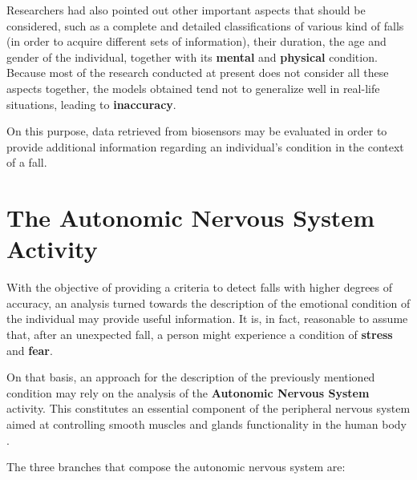 
Researchers had also pointed out other important aspects that should be considered, such as a complete and detailed classifications of various kind of falls (in order to acquire different sets of information), their duration, the age and gender of the individual, together with its \textbf{mental} and \textbf{physical} condition.
Because most of the research conducted at present does not consider all these aspects together, the models obtained tend not to generalize well in real-life situations, leading to \textbf{inaccuracy}.

On this purpose, data retrieved from biosensors may be evaluated in order to provide additional information regarding an individual's condition in the context of a fall.

\section{The Autonomic Nervous System Activity}\label{sec:edaintro}

With the objective of providing a criteria to detect falls with higher degrees of accuracy, an analysis turned towards the description of the emotional condition of the individual may provide useful information. It is, in fact, reasonable to assume that, after an unexpected fall, a person might experience a condition of \textbf{stress} and \textbf{fear}.

On that basis, an approach for the description of the previously mentioned condition may rely on the analysis of the \textbf{Autonomic Nervous System} activity. This constitutes an essential component of the peripheral nervous system aimed at controlling smooth muscles and glands functionality in the human body \cite{ansWiki}.

The three branches that compose the autonomic nervous system are:

